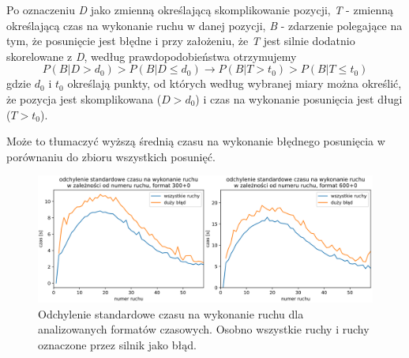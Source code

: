 \documentclass[inzynierska]{pwr_wmat_praca_dyplomowa}
\theoremstyle{plain}
\numberwithin{theorem}{chapter}
\theoremstyle{definition}
\numberwithin{theorem}{chapter}
\begin{document}
Po oznaczeniu \textit{D} jako zmienną określającą skomplikowanie pozycji, \textit{T} - zmienną określającą czas na wykonanie ruchu w danej pozycji, \textit{B} - zdarzenie polegające na tym, że posunięcie jest błędne i przy założeniu, że \textit{T} jest silnie dodatnio skorelowane z \textit{D}, według prawdopodobieństwa otrzymujemy %
\begin{equation}
	P(B|D>d_0) > P(B|D\leq d_0) \rightarrow P(B|T>t_0) > P(B|T\leq t_0)
\end{equation}
gdzie $d_0$ i $t_0$ określają punkty, od których według wybranej miary można określić, że pozycja jest skomplikowana ($D>d_0$) i czas na wykonanie posunięcia jest długi ($T>t_0$).


Może to tłumaczyć wyższą średnią czasu na wykonanie błędnego posunięcia w porównaniu do zbioru wszystkich posunięć.
\begin{figure}[h]
	\centering
	\includegraphics[width=\textwidth]{std_czas_na_ruch.png}
	\caption{Odchylenie standardowe czasu na wykonanie ruchu dla analizowanych formatów czasowych. Osobno wszystkie ruchy i ruchy oznaczone przez silnik jako błąd.}
	\label{rys:std_czas_na_ruch}
\end{figure}
\end{document}
